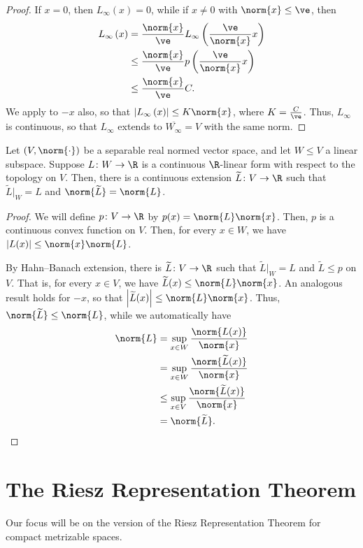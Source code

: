 \documentclass[10pt]{mypackage}
\begin{document}
\begin{proof}
  If $x = 0$, then $L_{\infty}(x) = 0$, while if $x\neq 0$ with $\norm{x} \leq \ve$, then
  \begin{align*}
    L_{\infty}\left( x \right) &= \frac{\norm{x}}{\ve}L_{\infty}\left( \frac{\ve}{\norm{x}}x \right)\\
                               &\leq \frac{\norm{x}}{\ve}p\left( \frac{\ve}{\norm{x}}x \right)\\
                               &\leq \frac{\norm{x}}{\ve}C.
  \end{align*}
  We apply to $-x$ also, so that $\left\vert L_{\infty}\left( x \right) \right\vert \leq K\norm{x}$, where $K = \frac{C}{\ve}$. Thus, $L_{\infty}$ is continuous, so that $L_{\infty}$ extends to $ \overline{W_{\infty}} = V $ with the same norm.
\end{proof}
\begin{corollary}
  Let $\left( V,\norm{\cdot} \right)$ be a separable real normed vector space, and let $W\leq V$ a linear subspace. Suppose $L\colon W\to \R$ is a continuous $\R$-linear form with respect to the topology on $V$. Then, there is a continuous extension $ \widetilde{L}\colon V\to \R $ such that $ \widetilde{L}|_{W} = L $ and $\norm{ \widetilde{L} } = \norm{L}$.
\end{corollary}
\begin{proof}
  We will define $p\colon V\to \R$ by $p(x) = \norm{L}\norm{x}$. Then, $p$ is a continuous convex function on $V$. Then, for every $x\in W$, we have $\left\vert L(x) \right\vert\leq \norm{x}\norm{L}$.

  By Hahn--Banach extension, there is $ \widetilde{L}\colon V\to \R $ such that $ \widetilde{L}|_{W} = L $ and $ \widetilde{L}\leq p $ on $V$. That is, for every $x\in V$, we have $ \widetilde{L}(x)\leq \norm{L}\norm{x} $. An analogous result holds for $-x$, so that $\left\vert \widetilde{L}(x) \right\vert\leq \norm{L}\norm{x}$. Thus, $ \norm{ \widetilde{L} }\leq \norm{L}$, while we automatically have
  \begin{align*}
    \norm{L} &= \sup_{x\in W} \frac{\norm{L(x)}}{\norm{x}}\\
             &= \sup_{x\in W} \frac{\norm{ \widetilde{L}(x) }}{\norm{x}}\\
             &\leq \sup_{x\in V} \frac{\norm{ \widetilde{L}(x) }}{\norm{x}}\\
             &= \norm{ \widetilde{L} }.
  \end{align*}
\end{proof}
\section{The Riesz Representation Theorem}%
Our focus will be on the version of the Riesz Representation Theorem for compact metrizable spaces.
\end{document}
